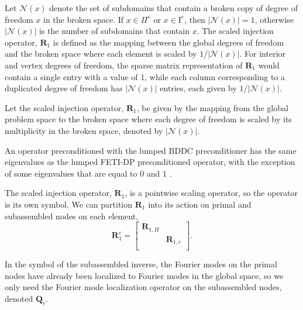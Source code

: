 \documentclass[review]{siamart190516}
\begin{document}
Let $\mathcal{N} \left( x \right)$ denote the set of subdomains that contain a broken copy of degree of freedom $x$ in the broken space.
If $x \in \Pi^e$ or $x \in \text{I}^e$, then $\lvert \mathcal{N} \left( x \right) \rvert = 1$, otherwise $\lvert \mathcal{N} \left( x \right) \rvert$ is the number of subdomains that contain $x$.
The scaled injection operator, $\mathbf{R}_1$ is defined as the mapping between the global degrees of freedom and the broken space where each element is scaled by $1 / \lvert \mathcal{N} \left( x \right) \rvert$.
For interior and vertex degrees of freedom, the sparse matrix representation of $\mathbf{R}_1$ would contain a single entry with a value of $1$, while each column corresponding to a duplicated degree of freedom has $\lvert \mathcal{N} \left( x \right) \rvert$ entries, each given by $1 / \lvert \mathcal{N} \left( x \right) \rvert$.

\begin{definition}\label{def:scaledinjection}
Let the scaled injection operator, $\mathbf{R}_1$, be given by the mapping from the global problem space to the broken space where each degree of freedom is scaled by its multiplicity in the broken space, denoted by $\lvert \mathcal{N} \left( x \right) \rvert$.
\end{definition}

An operator preconditioned with the lumped BDDC preconditioner has the same eigenvalues as the lumped FETI-DP preconditioned operator, with the exception of some eigenvalues that are equal to $0$ and $1$ \cite{li2007use}.

The scaled injection operator, $\mathbf{R}_1$, is a pointwise scaling operator, so the operator is its own symbol.
We can partition $\mathbf{R}_1$ into its action on primal and subassembled nodes on each element,
\begin{equation}
\mathbf{R}_1^e =
\begin{bmatrix}
\mathbf{R}_{1, \Pi} &                    \\
                    & \mathbf{R}_{1, r}  \\
\end{bmatrix}.
\end{equation}

In the symbol of the subassembled inverse, the Fourier modes on the primal nodes have already been localized to Fourier modes in the global space, so we only need the Fourier mode localization operator on the subassembled nodes, denoted $\mathbf{Q}_r$.
\end{document}
